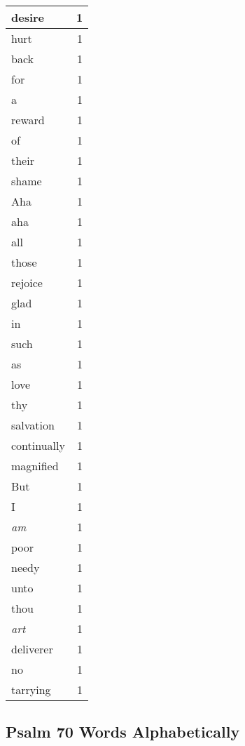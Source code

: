 \begin{center}
\begin{longtable}{l|r}
desire & 1\\ \hline 
hurt & 1\\ \hline 
back & 1\\ \hline 
for & 1\\ \hline 
a & 1\\ \hline 
reward & 1\\ \hline 
of & 1\\ \hline 
their & 1\\ \hline 
shame & 1\\ \hline 
Aha & 1\\ \hline 
aha & 1\\ \hline 
all & 1\\ \hline 
those & 1\\ \hline 
rejoice & 1\\ \hline 
glad & 1\\ \hline 
in & 1\\ \hline 
such & 1\\ \hline 
as & 1\\ \hline 
love & 1\\ \hline 
thy & 1\\ \hline 
salvation & 1\\ \hline 
continually & 1\\ \hline 
magnified & 1\\ \hline 
But & 1\\ \hline 
I & 1\\ \hline 
\emph{am} & 1\\ \hline 
poor & 1\\ \hline 
needy & 1\\ \hline 
unto & 1\\ \hline 
thou & 1\\ \hline 
\emph{art} & 1\\ \hline 
deliverer & 1\\ \hline 
no & 1\\ \hline 
tarrying & 1\\ \hline 
\end{longtable}
\end{center}





\subsection{Psalm 70 Words Alphabetically}


\normalsize
 
